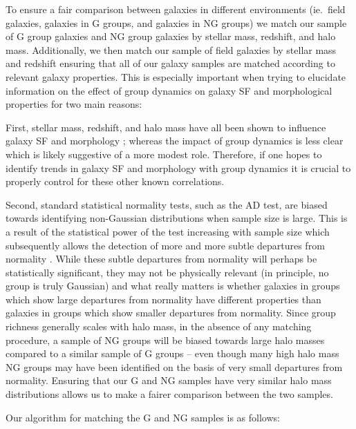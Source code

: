 \documentclass[a4paper,fleqn,usenatbib]{mnras}
\begin{document}
To ensure a fair comparison between galaxies in different environments
(ie.\ field galaxies, galaxies in G groups, and galaxies in NG groups)
we match our sample of G group galaxies and NG group galaxies by
stellar mass, redshift, and halo mass.  Additionally, we then match
our sample of field galaxies by stellar mass and redshift ensuring
that all of our galaxy samples are matched according to relevant galaxy
properties.  This is especially important when trying to elucidate
information on the effect of group dynamics on galaxy SF and
morphological properties for
two main reasons:
\par
First, stellar mass, redshift, and halo mass have
all been shown to influence galaxy SF and morphology
\citep[e.g.][]{brinchmann2004, feulner2005, zheng2007, cucciati2012,
  wetzel2012, lackner2013, tasca2014}; whereas
the impact of group dynamics is less clear \citep{hou2013,
  ribeiro2013} which is likely suggestive of a more modest role.
Therefore,
if one hopes to identify trends in galaxy SF and morphology with group
dynamics it is crucial to properly control for these other known correlations.
\par
Second, standard statistical normality tests, such as the AD test, are
biased towards identifying non-Gaussian distributions when
sample size is large.  This is a result of the statistical power of
the test increasing with sample size which subsequently allows the
detection of more and more subtle departures from normality
\citep{razali2011}.  While these subtle departures from normality will
perhaps be statistically significant, they may not be physically relevant (in
principle, no group is truly Gaussian) and what really matters is
whether galaxies in groups which show large departures from normality
have different properties than galaxies in groups which show smaller
departures from normality. Since group
richness generally scales with halo mass, in the absence of any matching
procedure, a sample of NG groups will be biased towards large halo
masses compared to a similar sample of G groups -- even though many
high halo mass NG groups may have been identified on the basis of very
small departures from normality.  Ensuring that our G and NG
samples have very similar halo mass distributions allows us to make a
fairer comparison between the two samples.
\par
Our algorithm for matching the G and NG samples is as follows:
\end{document}
